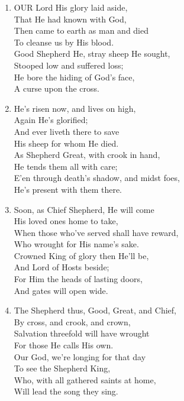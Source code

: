 \documentclass[11pt,a4paper]{article}
\begin{document}
\begin{enumerate}
    \item OUR Lord His glory laid aside, \\
            That He had known with God, \\
        Then came to earth as man and died \\
            To cleanse us by His blood. \\
        Good Shepherd He, stray sheep He sought, \\
            Stooped low and suffered loss; \\
        He bore the hiding of God's face, \\
            A curse upon the cross.

    \item He's risen now, and lives on high, \\
            Again He's glorified; \\
        And ever liveth there to save \\
            His sheep for whom He died. \\
        As Shepherd Great, with crook in hand, \\
            He tends them all with care; \\
        E'en through death's shadow, and midst foes, \\
            He's present with them there.

    \item Soon, as Chief Shepherd, He will come \\
            His loved ones home to take, \\
        When those who've served shall have reward, \\
            Who wrought for His name's sake. \\
        Crowned King of glory then He'll be, \\
            And Lord of Hosts beside; \\
        For Him the heads of lasting doors, \\
            And gates will open wide.

    \item The Shepherd thus, Good, Great, and Chief, \\
            By cross, and crook, and crown, \\
        Salvation threefold will have wrought \\
            For those He calls His own. \\
        Our God, we're longing for that day \\
            To see the Shepherd King, \\
        Who, with all gathered saints at home, \\
            Will lead the song they sing.

\end{enumerate}
\end{document}
